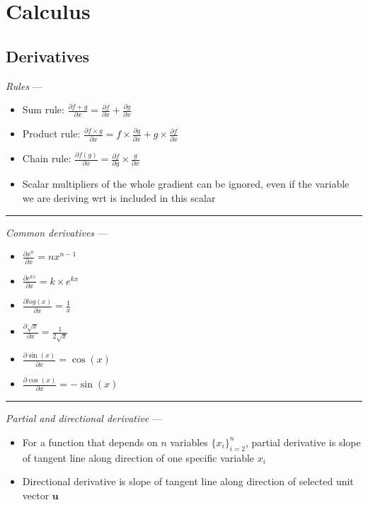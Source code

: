 \section{Calculus}
\subsection*{Derivatives}
\emph{Rules} --- 
\begin{itemize}
    \item Sum rule: $\frac{\partial f + g}{\partial x} = \frac{\partial f}{\partial x} + \frac{\partial g}{\partial x}$
    \item Product rule: $\frac{\partial f \times g}{\partial x} = f \times \frac{\partial g}{\partial x} + g \times \frac{\partial f}{\partial x}$
    \item Chain rule: $\frac{\partial f(g)}{\partial x} = \frac{\partial f}{\partial g} \times \frac{g}{\partial x}$
    \item Scalar multipliers of the whole gradient can be ignored, even if the variable we are deriving wrt is included in this scalar
\end{itemize}

{\color{lightgray}\hrule height 0.001mm}

\emph{Common derivatives} --- 
\begin{multicols}{2}
\begin{itemize}
    \item $\frac{\partial x^n}{\partial x} = nx^{n-1}$
    \item $\frac{\partial e^{kx}}{\partial x} = k \times e^{kx}$
    \item $\frac{\partial log(x)}{\partial x} = \frac{1}{x}$
    \item $\frac{\partial \sqrt{x}}{\partial x} = \frac{1}{2\sqrt{x}}$
    \item $\frac{\partial \sin(x)}{\partial x} = \cos(x)$
    \item $\frac{\partial \cos(x)}{\partial x} = -\sin(x)$
\end{itemize}
\end{multicols}

{\color{lightgray}\hrule height 0.001mm}

\emph{Partial and directional derivative} --- 
\begin{itemize}
    \item For a function that depends on $n$ variables $\{x_i\}_{i=2}^n$, partial derivative is slope of tangent line along direction of one specific variable $x_i$
    \item Directional derivative is slope of tangent line along direction of selected unit vector $\boldsymbol{u}$
\end{itemize}

